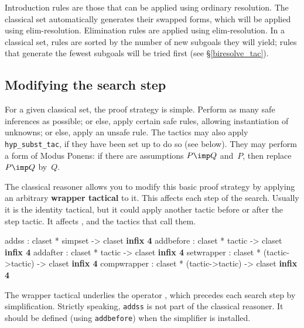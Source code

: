 Introduction rules are those that can be applied using ordinary resolution.
The classical set automatically generates their swapped forms, which will
be applied using elim-resolution.  Elimination rules are applied using
elim-resolution.  In a classical set, rules are sorted by the number of new
subgoals they will yield; rules that generate the fewest subgoals will be
tried first (see \S\ref{biresolve_tac}).


\subsection{Modifying the search step}
For a given classical set, the proof strategy is simple.  Perform as many
safe inferences as possible; or else, apply certain safe rules, allowing
instantiation of unknowns; or else, apply an unsafe rule.  The tactics may
also apply {\tt hyp_subst_tac}, if they have been set up to do so (see
below).  They may perform a form of Modus Ponens: if there are assumptions
$P\imp Q$ and~$P$, then replace $P\imp Q$ by~$Q$.

The classical reasoner allows you to modify this basic proof strategy by
applying an arbitrary {\bf wrapper tactical} to it.  This affects each step of
the search.  Usually it is the identity tactical, but it could apply another
tactic before or after the step tactic.  It affects ,
 and the tactics that call them.

\begin{ttbox} 
addss       : claset * simpset -> claset                  \hfill{\bf infix 4}
addbefore   : claset * tactic -> claset                   \hfill{\bf infix 4}
addafter    : claset * tactic -> claset                   \hfill{\bf infix 4}
setwrapper  : claset * (tactic->tactic) -> claset         \hfill{\bf infix 4}
compwrapper : claset * (tactic->tactic) -> claset         \hfill{\bf infix 4}
\end{ttbox}
%
The wrapper tactical underlies the operator , which precedes
each search step by simplification.  Strictly speaking, {\tt addss} is not
part of the classical reasoner.  It should be defined (using {\tt addbefore})
when the simplifier is installed.


